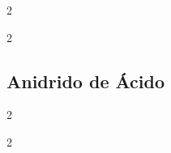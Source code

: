 \documentclass[\mainfilename]{subfiles}
\begin{document}
\begin{exampleBox}
\begin{multicols}{2}
        \begin{exampleBox}2{}\centering
            \\
        \end{exampleBox}
    
        \begin{exampleBox}2{}\centering
            \\
        \end{exampleBox}
    
    \end{multicols}

    \subsection*{Anidrido de Ácido}
    \vspace{-4ex}
    \begin{multicols}{2}
    
        \begin{exampleBox}2{}\centering
            \\
        \end{exampleBox}
    
        \begin{exampleBox}2{}\centering
            \vspace{1ex}
        \end{exampleBox}
    
    \end{multicols}
\end{exampleBox}
\end{document}

